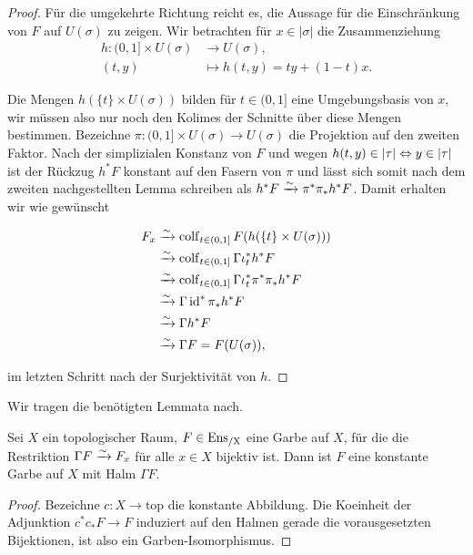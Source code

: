 \begin{proof}
    Für die umgekehrte Richtung reicht es, die Aussage für die
  Einschränkung von $F$ auf $U(\sigma)$ zu zeigen.  Wir betrachten für
  $x \in |\sigma|$ die Zusammenziehung
    \begin{align*}
    h: (0, 1] \times U(\sigma) &\to U(\sigma), \\
    (t, y) &\mapsto h(t, y) = t y + (1 - t) x.
  \end{align*}
  
  Die Mengen $h(\{t\} \times U(\sigma))$ bilden für $t \in (0, 1]$
    eine Umgebungsbasis von $x$, wir müssen also nur noch den Kolimes
    der Schnitte über diese Mengen bestimmen. Bezeichne $\pi: (0, 1]
      \times U(\sigma) \to U(\sigma)$ die Projektion auf den zweiten
      Faktor. Nach der simplizialen Konstanz von $F$ und wegen $h(t,
      y) \in |\tau| \Leftrightarrow y \in |\tau|$ ist der Rückzug $h^* F$
      konstant auf den Fasern von $\pi$ und lässt sich somit nach dem
      zweiten nachgestellten Lemma schreiben als $h^* F \xrightarrow{\sim} \pi^*
      \pi_* h^* F$. Damit erhalten wir wie gewünscht
      
      \begin{align*}
      F_x &\xrightarrow{\sim} \operatorname{colf}\limits_{t \in (0, 1]} F(h(\{t\} \times U(\sigma))) \\
        &\xrightarrow{\sim} \operatorname{colf}\limits_{t \in (0, 1]} \Gamma \iota_t^* h^* F \\
        &\xrightarrow{\sim} \operatorname{colf}\limits_{t \in (0, 1]} \Gamma \iota_t^* \pi^* \pi_* h^* F \\
        &\xrightarrow{\sim} \Gamma \operatorname{id}^* \pi_* h^* F \\
        &\xrightarrow{\sim} \Gamma h^* F \\
        &\xrightarrow{\sim} \Gamma F = F(U(\sigma)),
      \end{align*}

        im letzten Schritt nach der Surjektivität von $h$.

\end{proof}

Wir tragen die benötigten Lemmata nach.

\begin{lemma}[\cite{TG}, 2.1.41]
  Sei $X$ ein topologischer Raum, $F \in \operatorname{Ens_{/X}}$ eine Garbe auf $X$,
  für die die Restriktion $\Gamma F \xrightarrow{\sim} F_x$ für alle $x \in X$
  bijektiv ist. Dann ist $F$ eine konstante Garbe auf $X$ mit Halm
  $\Gamma F$.
\end{lemma}
\begin{proof}
  Bezeichne $c: X \to \mathrm{top}$ die konstante Abbildung. Die
  Koeinheit der Adjunktion $c^* c_* F \to F$ induziert auf den Halmen
  gerade die vorausgesetzten Bijektionen, ist also ein
  Garben-Isomorphismus.
\end{proof}

